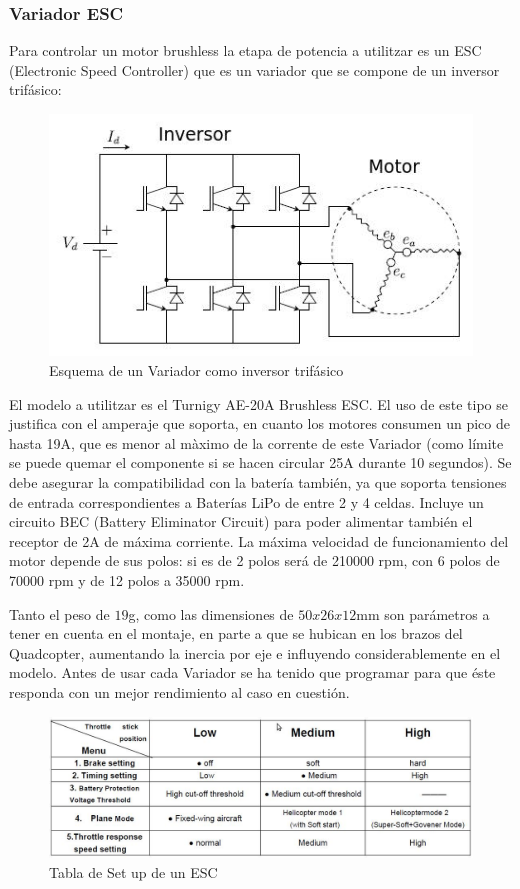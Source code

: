 \documentclass[twoside]{article}
\begin{document}
\subsubsection*{Variador ESC}


Para controlar un motor brushless la etapa de potencia a utilitzar es un ESC (Electronic Speed Controller) que es un  variador que se compone de un inversor trifásico:
\begin{figure}[h!]
\begin{center}
\includegraphics[scale=0.4]{images/ESC.jpeg}
\caption{Esquema de un Variador como inversor trifásico}
\end{center}
\end{figure}
El modelo a utilitzar es el Turnigy AE-20A Brushless ESC. El uso de este tipo se justifica con el amperaje que soporta, en cuanto los motores consumen un pico de hasta 19A, que es menor al màximo de la corrente de este Variador (como límite se puede quemar el componente si se hacen circular 25A durante 10 segundos). 
Se debe asegurar la compatibilidad con la batería también, ya que soporta tensiones de entrada correspondientes a Baterías LiPo de entre 2 y 4 celdas. 
Incluye un circuito BEC (Battery Eliminator Circuit) para poder alimentar también el receptor de 2A de máxima corriente. 
La máxima velocidad de funcionamiento del motor depende de sus polos: si es de 2 polos será de 210000 rpm, con 6 polos de 70000 rpm y de 12 polos a 35000 rpm.


Tanto el peso de $19$g,  como las dimensiones de $50x26x12$mm son parámetros a tener en cuenta en el montaje, en parte a que se hubican en los brazos del Quadcopter, aumentando la inercia por eje e influyendo considerablemente en el modelo. Antes de usar cada Variador se ha tenido que programar para que éste responda con un mejor rendimiento al caso en cuestión.

\begin{figure}[h!]
\begin{center}
\includegraphics[scale=0.5]{images/ESC_config.jpeg}
\caption{Tabla de Set up de un ESC}
\end{center}
\end{figure}
\end{document}

